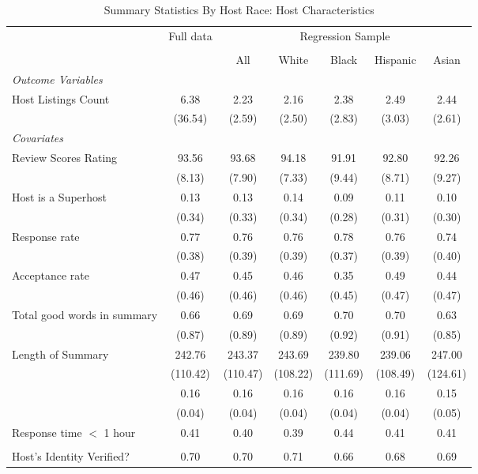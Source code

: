 \begin{table}[htbp]
\caption{Summary Statistics By Host Race: Host Characteristics}
\begin{center}%
\small\begin{tabular}{l c | c | c c c c}
& \multicolumn{1}{c}{Full data} & \multicolumn{5}{c}{Regression Sample}
\\
 \cmidrule(r){3-7}
\\
 & \multicolumn{1}{c}{} & \multicolumn{1}{c}{All} & White & Black & Hispanic & Asian
\\
\hline\hline\noalign{\smallskip} 
 \textit{\textit{Outcome Variables}} & & & & & & \\ Host Listings Count & 6.38 & 2.23 & 2.16 & 2.38 & 2.49 & 2.44 \\
 & (36.54) & (2.59) & (2.50) & (2.83) & (3.03) & (2.61) \\
 \textit{Covariates} & & & & & & \\ \hline Review Scores Rating & 93.56 & 93.68 & 94.18 & 91.91 & 92.80 & 92.26 \\
 & (8.13) & (7.90) & (7.33) & (9.44) & (8.71) & (9.27) \\
 Host is a Superhost & 0.13 & 0.13 & 0.14 & 0.09 & 0.11 & 0.10 \\
 & (0.34) & (0.33) & (0.34) & (0.28) & (0.31) & (0.30) \\
 Response rate & 0.77 & 0.76 & 0.76 & 0.78 & 0.76 & 0.74 \\
 & (0.38) & (0.39) & (0.39) & (0.37) & (0.39) & (0.40) \\
 Acceptance rate & 0.47 & 0.45 & 0.46 & 0.35 & 0.49 & 0.44 \\
 & (0.46) & (0.46) & (0.46) & (0.45) & (0.47) & (0.47) \\
 Total good words in summary & 0.66 & 0.69 & 0.69 & 0.70 & 0.70 & 0.63 \\
 & (0.87) & (0.89) & (0.89) & (0.92) & (0.91) & (0.85) \\
 Length of Summary & 242.76 & 243.37 & 243.69 & 239.80 & 239.06 & 247.00 \\
 & (110.42) & (110.47) & (108.22) & (111.69) & (108.49) & (124.61) \\
  & 0.16 & 0.16 & 0.16 & 0.16 & 0.16 & 0.15 \\
 & (0.04) & (0.04) & (0.04) & (0.04) & (0.04) & (0.05) \\
 Response time $<$ 1 hour & 0.41 & 0.40 & 0.39 & 0.44 & 0.41 & 0.41 \\  &  &  &  &  &  &  \\ Host's Identity Verified? & 0.70 & 0.70 & 0.71 & 0.66 & 0.68 & 0.69 \\

\end{tabular}
\end{center}
\end{table}
